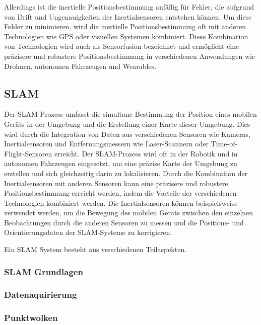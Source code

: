 Allerdings ist die inertielle Positionsbestimmung anfällig für Fehler, die aufgrund von Drift und Ungenauigkeiten der Inertialsensoren entstehen können. Um diese Fehler zu minimieren, wird die inertielle Positionsbestimmung oft mit anderen Technologien wie GPS oder visuellen Systemen kombiniert. Diese Kombination von Technologien wird auch als Sensorfusion bezeichnet und ermöglicht eine präzisere und robustere Positionsbestimmung in verschiedenen Anwendungen wie Drohnen, autonomen Fahrzeugen und Wearables.

\subsection{SLAM}\label{SLAM:section} \label{positionsbestimmung:section}

Der SLAM-Prozess umfasst die simultane Bestimmung der Position eines mobilen Geräts in der Umgebung und die Erstellung einer Karte dieser Umgebung. Dies wird durch die Integration von Daten aus verschiedenen Sensoren wie Kameras, Inertialsensoren und Entfernungsmessern wie Laser-Scannern oder Time-of-Flight-Sensoren erreicht. Der SLAM-Prozess wird oft in der Robotik und in autonomen Fahrzeugen eingesetzt, um eine präzise Karte der Umgebung zu erstellen und sich gleichzeitig darin zu lokalisieren.
Durch die Kombination der Inertialsensoren mit anderen Sensoren kann eine präzisere und robustere Positionsbestimmung erreicht werden, indem die Vorteile der verschiedenen Technologien kombiniert werden. Die Inertialsensoren können beispielsweise verwendet werden, um die Bewegung des mobilen Geräts zwischen den einzelnen Beobachtungen durch die anderen Sensoren zu messen und die Positions- und Orientierungsdaten der SLAM-Systeme zu korrigieren.

Ein SLAM System besteht aus verschiedenen Teilaspekten.

\subsubsection{SLAM Grundlagen}

\subsubsection{Datenaquirierung}



\subsubsection{Punktwolken}

